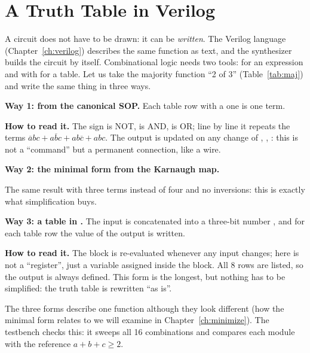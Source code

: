 \section{A Truth Table in Verilog}
\label{sec:comb-verilog}

A circuit does not have to be drawn: it can be \emph{written}. The Verilog
language (Chapter~\ref{ch:verilog}) describes the same function as text, and
the synthesizer builds the circuit by itself. Combinational logic needs two
tools:  for an expression and  with 
for a table. Let us take the majority function ``2 of 3''
(Table~\ref{tab:maj}) and write the same thing in three ways.

\textbf{Way 1: from the canonical SOP.} Each table row with a one is one
term.


\textbf{How to read it.} The sign \code{\textasciitilde} is NOT, \code{\&} is AND,
\code{|} is OR; line by line it repeats the terms
$\overline{a}bc+a\overline{b}c+ab\overline{c}+abc$. The output  is updated
on any change of , , : this is not a ``command'' but a
permanent connection, like a wire.

\textbf{Way 2: the minimal form from the Karnaugh map.}


The same result with three terms instead of four and no inversions: this is
exactly what simplification buys.

\textbf{Way 3: a table in .} The input is concatenated into a
three-bit number , and for each table row the value of the
output is written.


\textbf{How to read it.} The  block is re-evaluated whenever any
input changes;  here is not a ``register'', just a variable assigned
inside the block. All 8 rows are listed, so the output is always defined. This
form is the longest, but nothing has to be simplified: the truth table is
rewritten ``as is''.

The three forms describe one function although they look different (how the
minimal form relates to  we will examine in
Chapter~\ref{ch:minimize}). The testbench  checks this: it
sweeps all 16 combinations and compares each module with the reference
$a+b+c\ge2$.

